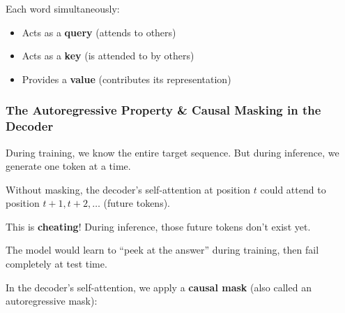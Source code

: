 \documentclass{article}
\begin{document}
Each word simultaneously:
\begin{itemize}
\item Acts as a \textbf{query} (attends to others)
\item Acts as a \textbf{key} (is attended to by others)
\item Provides a \textbf{value} (contributes its representation)
\end{itemize}


\subsubsection{The Autoregressive Property \& Causal Masking in the Decoder}

During training, we know the entire target sequence. But during inference, we generate one token at a time.

\begin{tcolorbox}[colback=red!5!white, colframe=red!75!black, title=The Cheating Problem]
Without masking, the decoder's self-attention at position $t$ could attend to position $t+1, t+2, \ldots$ (future tokens).

This is \textbf{cheating}! During inference, those future tokens don't exist yet.

The model would learn to ``peek at the answer'' during training, then fail completely at test time.
\end{tcolorbox}



In the decoder's self-attention, we apply a \textbf{causal mask} (also called an autoregressive mask):

\begin{center}
\end{center}
\end{document}
